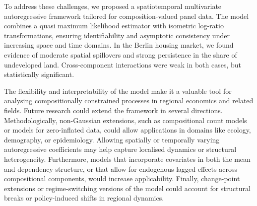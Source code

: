 \documentclass[12pt]{article}
\theoremstyle{plain}
\theoremstyle{definition}
\begin{document}
To address these challenges, we proposed a spatiotemporal multivariate autoregressive framework tailored for composition-valued panel data. The model combines a quasi maximum likelihood estimator with isometric log-ratio transformations, ensuring identifiability and asymptotic consistency under increasing space and time domains. In the Berlin housing market, we found evidence of moderate spatial spillovers and strong persistence in the share of undeveloped land. Cross-component interactions were weak in both cases, but statistically significant.

The flexibility and interpretability of the model make it a valuable tool for analysing compositionally constrained processes in regional economics and related fields. Future research could extend the framework in several directions. Methodologically, non-Gaussian extensions, such as compositional count models or models for zero-inflated data, could allow applications in domains like ecology, demography, or epidemiology. Allowing spatially or temporally varying autoregressive coefficients may help capture localised dynamics or structural heterogeneity. Furthermore, models that incorporate covariates in both the mean and dependency structure, or that allow for endogenous lagged effects across compositional components, would increase applicability. Finally, change-point extensions or regime-switching versions of the model could account for structural breaks or policy-induced shifts in regional dynamics.







\newpage



\end{document}
